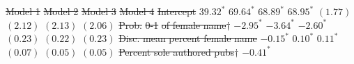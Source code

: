 \documentclass[
  10pt,
  letterpaper,
]{article}
\providecommand{\DIFdeltex}[1]{{\protect\color{red}\sout{#1}}}                      %
\providecommand{\DIFdelbegin}{} %
\providecommand{\DIFdelFL}[1]{\DIFdel{#1}} %
\providecommand{\DIFaddbeginFL}{} %
\providecommand{\DIFaddendFL}{} %
\providecommand{\DIFdelbeginFL}{} %
\providecommand{\DIFdelendFL}{} %
\providecommand{\DIFdel}[1]{\texorpdfstring{\DIFdeltex{#1}}{}} %
\newcommand{\DIFscaledelfig}{0.5}
\newlength{\DIFdelgraphicswidth} %
\newlength{\DIFdelgraphicsheight} %
\newcommand{\DIFaddincludegraphics}[2][]{{\color{blue}\fbox{\DIFOincludegraphics[#1]{#2}}}} %
\newcommand{\DIFdelincludegraphics}[2][]{%
\sbox{\DIFdelgraphicsbox}{\DIFOincludegraphics[#1]{#2}}%
\settoboxwidth{\DIFdelgraphicswidth}{\DIFdelgraphicsbox} %
\settoboxtotalheight{\DIFdelgraphicsheight}{\DIFdelgraphicsbox} %
\scalebox{\DIFscaledelfig}{%
\parbox[b]{\DIFdelgraphicswidth}{\usebox{\DIFdelgraphicsbox}\\[-\baselineskip] \rule{\DIFdelgraphicswidth}{0em}}\llap{\resizebox{\DIFdelgraphicswidth}{\DIFdelgraphicsheight}{%
\setlength{\unitlength}{\DIFdelgraphicswidth}%
\begin{picture}(1,1)%
\thicklines\linethickness{2pt} %
{\color[rgb]{1,0,0}\put(0,0){\framebox(1,1){}}}%
{\color[rgb]{1,0,0}\put(0,0){\line( 1,1){1}}}%
{\color[rgb]{1,0,0}\put(0,1){\line(1,-1){1}}}%
\end{picture}%
}\hspace*{3pt}}} %
} %
\DeclareRobustCommand{\DIFdelbegin}{\DIFOdelbegin \let\includegraphics\DIFdelincludegraphics} %
\DeclareRobustCommand{\DIFaddbeginFL}{\DIFOaddbeginFL \let\includegraphics\DIFaddincludegraphics} %
\DeclareRobustCommand{\DIFaddendFL}{\DIFOaddendFL \let\includegraphics\DIFOincludegraphics} %
\DeclareRobustCommand{\DIFdelbeginFL}{\DIFOdelbeginFL \let\includegraphics\DIFdelincludegraphics} %
\DeclareRobustCommand{\DIFdelendFL}{\DIFOaddendFL \let\includegraphics\DIFOincludegraphics} %
\begin{document}
\DIFdelbegin %
\DIFdelendFL \DIFaddbeginFL \begin{table}

\DIFaddendFL \caption{\label{tbl-models-full}Multilevel models predicting
\emph{h}-index score across all disciplines with clustering at the
disciplinary level.}
\DIFdelbeginFL %
\DIFdelFL{Model 1 }%
\DIFdelFL{Model 2 }%
\DIFdelFL{Model 3 }%
\DIFdelFL{Model 4 }%
\DIFdelFL{Intercept                               }%
\DIFdelFL{$39.32^{*}$ }%
\DIFdelFL{$69.64^{*}$  }%
\DIFdelFL{$68.89^{*}$  }%
\DIFdelFL{$68.95^{*}$  }%
\DIFdelFL{$(1.77)$    }%
\DIFdelFL{$(2.12)$     }%
\DIFdelFL{$(2.13)$     }%
\DIFdelFL{$(2.06)$     }%
\DIFdelFL{Prob. }%
\DIFdelFL{0-1}%
\DIFdelFL{of female name$\dagger$     }%
\DIFdelFL{$-2.95^{*}$ }%
\DIFdelFL{$-3.64^{*}$  }%
\DIFdelFL{$-2.60^{*}$  }%
\DIFdelFL{$(0.23)$    }%
\DIFdelFL{$(0.22)$     }%
\DIFdelFL{$(0.23)$     }%
\DIFdelFL{Disc. mean percent female name          }%
\DIFdelFL{$-0.15^{*}$ }%
\DIFdelFL{$0.10^{*}$   }%
\DIFdelFL{$0.11^{*}$   }%
\DIFdelFL{$(0.07)$    }%
\DIFdelFL{$(0.05)$     }%
\DIFdelFL{$(0.05)$     }%
\DIFdelFL{Percent sole authored pubs$\dagger$     }%
\DIFdelFL{$-0.41^{*}$  }%

\end{table}
\end{document}
